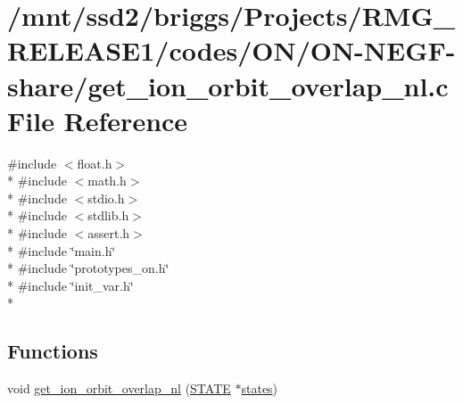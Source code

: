 \hypertarget{_o_n_2_o_n-_n_e_g_f-share_2get__ion__orbit__overlap__nl_8c}{\section{/mnt/ssd2/briggs/\-Projects/\-R\-M\-G\-\_\-\-R\-E\-L\-E\-A\-S\-E1/codes/\-O\-N/\-O\-N-\/\-N\-E\-G\-F-\/share/get\-\_\-ion\-\_\-orbit\-\_\-overlap\-\_\-nl.c File Reference}
\label{_o_n_2_o_n-_n_e_g_f-share_2get__ion__orbit__overlap__nl_8c}
}
{\ttfamily \#include $<$float.\-h$>$}\\*
{\ttfamily \#include $<$math.\-h$>$}\\*
{\ttfamily \#include $<$stdio.\-h$>$}\\*
{\ttfamily \#include $<$stdlib.\-h$>$}\\*
{\ttfamily \#include $<$assert.\-h$>$}\\*
{\ttfamily \#include \char`\"{}main.\-h\char`\"{}}\\*
{\ttfamily \#include \char`\"{}prototypes\-\_\-on.\-h\char`\"{}}\\*
{\ttfamily \#include \char`\"{}init\-\_\-var.\-h\char`\"{}}\\*
\subsection*{Functions}
\begin{DoxyCompactItemize}
\item 
void \hyperlink{_o_n_2_o_n-_n_e_g_f-share_2get__ion__orbit__overlap__nl_8c_ab674d3bb0a71537d21c3cd255a3b0967}{get\-\_\-ion\-\_\-orbit\-\_\-overlap\-\_\-nl} (\hyperlink{struct_s_t_a_t_e}{S\-T\-A\-T\-E} $\ast$\hyperlink{md_8h_a286ebf6b996d2b1827eb9a889dfc83d7}{states})
\end{DoxyCompactItemize}


